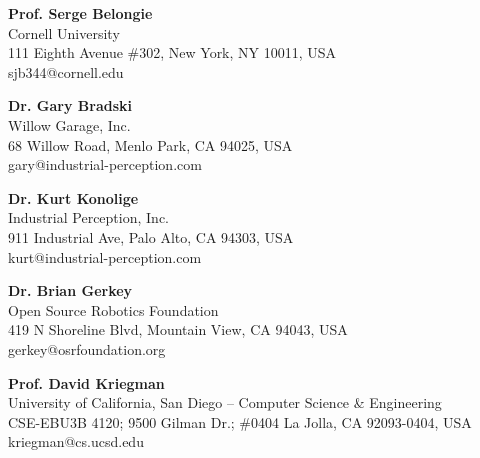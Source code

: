 

\textbf{Prof. Serge Belongie}\\
Cornell University\\
111 Eighth Avenue \#302, New York, NY 10011, USA\\
sjb344@cornell.edu

\textbf{Dr. Gary Bradski}\\
Willow Garage, Inc. \\
68 Willow Road, Menlo Park, CA 94025, USA\\
gary@industrial-perception.com

\textbf{Dr. Kurt Konolige}\\
Industrial Perception, Inc. \\
911 Industrial Ave, Palo Alto, CA 94303, USA\\
kurt@industrial-perception.com

\textbf{Dr. Brian Gerkey}\\
Open Source Robotics Foundation\\
419 N Shoreline Blvd, Mountain View, CA 94043, USA\\
gerkey@osrfoundation.org

\textbf{Prof. David Kriegman}\\
University of California, San Diego – Computer Science \& Engineering\\
CSE-EBU3B 4120; 9500 Gilman Dr.; \#0404 La Jolla, CA 92093-0404, USA\\
kriegman@cs.ucsd.edu
